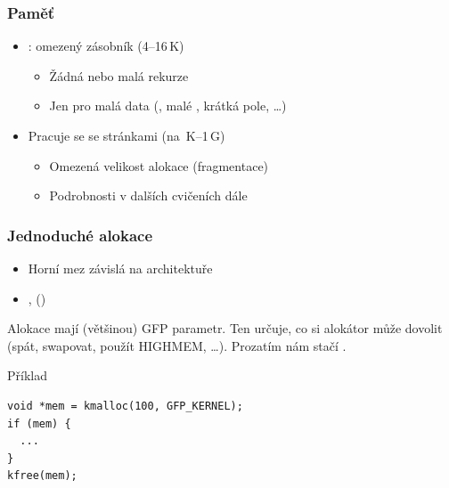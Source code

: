 \begin{frame}
  \frametitle{Paměť}

  \begin{itemize}
    \item \pozor: omezený zásobník (4--16\,K)
    \begin{itemize}
      \item Žádná nebo malá rekurze
      \item Jen pro malá data (, malé , krátká pole,
	\dots)
    \end{itemize}

    \pause

    \item Pracuje se se stránkami (na \,K--1\,G)
    \begin{itemize}
      \item Omezená velikost alokace (fragmentace)
      \item Podrobnosti \iffimuni v dalších cvičeních \else dále \fi
    \end{itemize}
  \end{itemize}

\end{frame}

\begin{frame}[fragile]
  \frametitle{Jednoduché alokace}

  \begin{itemize}
  \item Horní mez závislá na architektuře
  \item {},  ()
  \end{itemize}

  \pause
  \bigskip

  Alokace mají (většinou) GFP parametr. Ten určuje, co si alokátor může dovolit
  (spát, swapovat, použít HIGHMEM, \dots). Prozatím nám stačí
  .

  \pause
  \medskip

  \begin{block}{Příklad}
  \begin{lstlisting}
void *mem = kmalloc(100, GFP_KERNEL);
if (mem) {
  ...
}
kfree(mem);
  \end{lstlisting}
  \end{block}

\end{frame}

